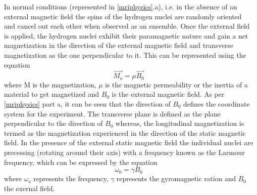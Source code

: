 \documentclass[msthesis.tex]{subfiles}
\begin{document}
In normal conditions (represented in \autoref{mriphysics}.a), i.e. in the absence of an external magnetic field the spins of the hydrogen nuclei are randomly oriented and cancel out each other when observed as an ensemble. Once the external field is applied, the hydrogen nuclei exhibit their paramagnetic nature and gain a net magnetization in the direction of the external magnetic field and transverse magnetization as the one perpendicular to it. This can be represented using the equation
\begin{equation}
       \Vec{M_o} = \mu \Vec{B_0}
\end{equation}
where M is the magnetization, $\mu$ is the magnetic permeability or the inertia of a material to get magnetized and $B_0$ is the external magnetic field. As per \autoref{mriphysics} part a, it can be seen that the direction of $B_0$ defines the coordinate system for the experiment. The transverse plane is defined as the plane perpendicular to the direction of $B_0$ whereas, the longitudinal magnetization is termed as the magnetization experienced in the direction of the static magnetic field. In the presence of the external static magnetic field the individual nuclei are precessing (rotating around their axis) with a frequency known as the Larmour frequency, which can be expressed by the equation
\begin{equation}
    \omega_0 = \gamma B_0
    \label{larmour}
\end{equation}
where $\omega_o$ represents the frequency, $\gamma$ represents the gyromagnetic ration and $B_0$ the exernal field.
\end{document}
